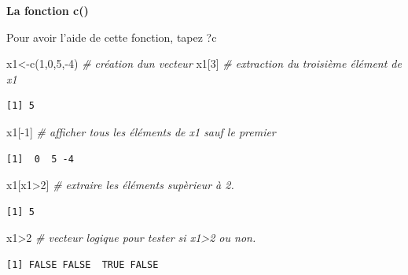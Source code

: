 \documentclass[
  8pt,
  ignorenonframetext,
]{beamer}
\newenvironment{Shaded}{\begin{snugshade}}{\end{snugshade}}
\newcommand{\CommentTok}[1]{\textcolor[rgb]{0.56,0.35,0.01}{\textit{#1}}}
\newcommand{\DecValTok}[1]{\textcolor[rgb]{0.00,0.00,0.81}{#1}}
\newcommand{\FunctionTok}[1]{\textcolor[rgb]{0.00,0.00,0.00}{#1}}
\newcommand{\NormalTok}[1]{#1}
\newcommand{\OtherTok}[1]{\textcolor[rgb]{0.56,0.35,0.01}{#1}}
\newcommand{\SpecialCharTok}[1]{\textcolor[rgb]{0.00,0.00,0.00}{#1}}
\begin{document}
\begin{frame}[fragile]
\textbf{La fonction c()}

Pour avoir l'aide de cette fonction, tapez ?c

\begin{Shaded}
\begin{Highlighting}[]
\NormalTok{x1}\OtherTok{\textless{}{-}}\FunctionTok{c}\NormalTok{(}\DecValTok{1}\NormalTok{,}\DecValTok{0}\NormalTok{,}\DecValTok{5}\NormalTok{,}\SpecialCharTok{{-}}\DecValTok{4}\NormalTok{)  }\CommentTok{\# création d\textquotesingle{}un vecteur}
\NormalTok{x1[}\DecValTok{3}\NormalTok{]            }\CommentTok{\# extraction du troisième élément de x1}
\end{Highlighting}
\end{Shaded}

\begin{verbatim}
[1] 5
\end{verbatim}

\begin{Shaded}
\begin{Highlighting}[]
\NormalTok{x1[}\SpecialCharTok{{-}}\DecValTok{1}\NormalTok{]           }\CommentTok{\# afficher tous les éléments de x1 sauf le premier}
\end{Highlighting}
\end{Shaded}

\begin{verbatim}
[1]  0  5 -4
\end{verbatim}

\begin{Shaded}
\begin{Highlighting}[]
\NormalTok{x1[x1}\SpecialCharTok{\textgreater{}}\DecValTok{2}\NormalTok{]         }\CommentTok{\# extraire les éléments supèrieur à 2.}
\end{Highlighting}
\end{Shaded}

\begin{verbatim}
[1] 5
\end{verbatim}

\begin{Shaded}
\begin{Highlighting}[]
\NormalTok{x1}\SpecialCharTok{\textgreater{}}\DecValTok{2}             \CommentTok{\# vecteur logique pour tester si x1\textgreater{}2 ou non.}
\end{Highlighting}
\end{Shaded}

\begin{verbatim}
[1] FALSE FALSE  TRUE FALSE
\end{verbatim}


\end{frame}
\end{document}
